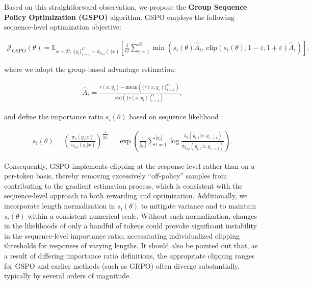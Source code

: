 Based on this straightforward observation, we propose the \textbf{Group Sequence Policy Optimization (GSPO)} algorithm. GSPO employs the following sequence-level optimization objective:

\begin{align}
\mathcal{J}_\text{GSPO} (\theta) =
\mathbb{E}_{ x \sim \mathcal{D},\, \{y_i\}_{i=1}^G \sim \pi_{\theta_\text{old}}( \cdot | x) }
\left[ 
\frac{1}{G} \sum_{i=1}^{G}
\min \left( s_{i}(\theta)  \widehat{A}_{i},  \, \mathrm{clip} \left( s_{i}(\theta), 1 - {\varepsilon}, 1 + {\varepsilon} \right) \widehat{A}_{i} \right) 
\right],
\label{equ:gspo}
\end{align}

where we adopt the group-based advantage estimation:

\begin{align}
\widehat{A}_{i} = \frac{r(x, y_i) - \mathrm{mean} \left( \{ r(x, y_i) \}_{i=1}^G \right) }{ \mathrm{std} \left( \{ r(x, y_i) \}_{i=1}^G \right) },
\end{align}

and define the importance ratio $s_{i}(\theta)$ based on sequence likelihood \citep{click}:

\begin{align}
s_{i}(\theta) = \left( \frac{ \pi_{\theta} (y_i | x) }{ \pi_{\theta_\text{old}} (y_i | x)} \right)^{\frac{1}{|y_i|}}
=
\exp \left( \frac{1}{|y_i|} \sum_{t=1}^{|y_i|} \log \frac{ \pi_{\theta} (y_{i,t} | x, y_{i,<t}) }{ \pi_{\theta_\text{old}} (y_{i,t} | x,y_{i,<t})} \right).
\end{align}

Consequently, GSPO implements clipping at the response level rather than on a per-token basis, thereby removing excessively “off-policy” samples from contributing to the gradient estimation process, which is consistent with the sequence-level approach to both rewarding and optimization. Additionally, we incorporate length normalization in $s_{i}(\theta)$ to mitigate variance and to maintain $s_{i}(\theta)$ within a consistent numerical scale. Without such normalization, changes in the likelihoods of only a handful of tokens could provoke significant instability in the sequence-level importance ratio, necessitating individualized clipping thresholds for responses of varying lengths. It should also be pointed out that, as a result of differing importance ratio definitions, the appropriate clipping ranges for GSPO and earlier methods (such as GRPO) often diverge substantially, typically by several orders of magnitude.


